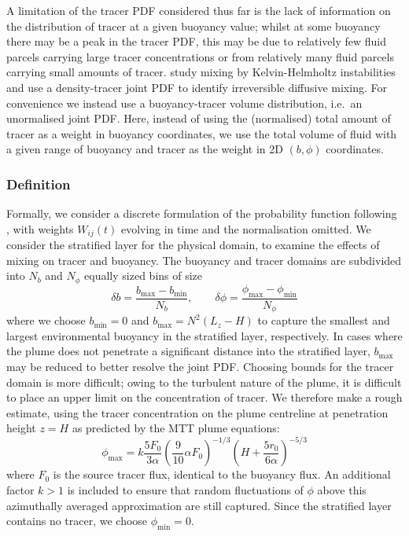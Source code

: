\documentclass[a4paper]{article}
\begin{document}
A limitation of the tracer PDF considered thus far is the lack of information on the distribution of tracer at
a given buoyancy value; whilst at some buoyancy there may be a peak in the tracer PDF, this may be due to
relatively few fluid parcels carrying large tracer concentrations or from relatively many fluid parcels
carrying small amounts of tracer. \citet{penney2020} study mixing by Kelvin-Helmholtz instabilities and use a
density-tracer joint PDF to identify irreversible diffusive mixing. For convenience we instead use a
buoyancy-tracer volume distribution, i.e.\ an unormalised joint PDF. Here, instead of using the (normalised)
total amount of tracer as a weight in buoyancy coordinates, we use the total volume of fluid with a given
range of buoyancy and tracer as the weight in 2D $(b, \phi)$ coordinates.

\subsubsection{Definition}
Formally, we consider a discrete formulation of the probability function following \citet{plumb2007}, with
weights $W_{ij}(t)$ evolving in time and the normalisation omitted. We consider the stratified layer for the
physical domain, to examine the effects of mixing on tracer and buoyancy. The buoyancy and tracer domains are
subdivided into $N_b$ and $N_\phi$ equally sized bins of size
\begin{equation}
	\delta b = \frac{b_{\max} - b_{\min}}{N_b}, \hspace{2em} \delta \phi = \frac{\phi_{\max} -
		\phi_{\min}}{N_\phi}
\end{equation}
where we choose $b_{\min} = 0$ and $b_{\max} = N^2 (L_z - H)$ to capture the smallest and largest
environmental buoyancy in the stratified layer, respectively. In cases where the plume does not penetrate a
significant distance into the stratified layer, $b_{\max}$ may be reduced to better resolve the joint PDF.
Choosing bounds for the tracer domain is more difficult; owing to the turbulent nature of the plume, it is
difficult to place an upper limit on the concentration of tracer. We therefore make a rough estimate, using
the tracer concentration on the plume centreline at penetration height $z=H$ as predicted by
the MTT plume equations:
\begin{equation}
	\phi_{\max}  = k\frac{5F_0}{3\alpha} \left(\frac{9}{10}\alpha F_0\right)^{-1/3} \left(H +
		\frac{5r_0}{6\alpha}\right)^{-5/3}
\end{equation}
where $F_0$ is the source tracer flux, identical to the buoyancy flux. An additional factor $k > 1$ is
included to ensure that random fluctuations of $\phi$ above this azimuthally averaged approximation are still
captured. Since the stratified layer contains no tracer, we choose $\phi_{\min} = 0$.
\end{document}
